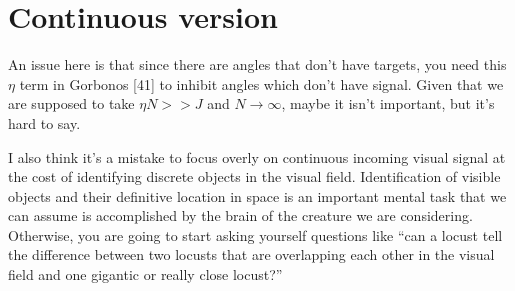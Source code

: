 \documentclass[12pt]{article}
\begin{document}
\section*{Continuous version}
An issue here is that since there are angles that don't have targets, you need this $\eta$ term in Gorbonos [41] to inhibit angles which don't have signal. Given that we are supposed to take $\eta N >> J$ and $N\rightarrow\infty$, maybe it isn't important, but it's hard to say.

I also think it's a mistake to focus overly on continuous incoming visual signal at the cost of identifying discrete objects in the visual field. Identification of visible objects and their definitive location in space is an important mental task that we can assume is accomplished by the brain of the creature we are considering. Otherwise, you are going to start asking yourself questions like ``can a locust tell the difference between two locusts that are overlapping each other in the visual field and one gigantic or really close locust?''
\end{document}
